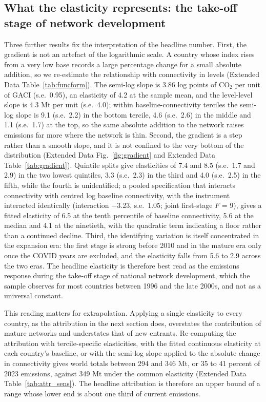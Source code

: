\documentclass[12pt]{article}
\begin{document}
\subsection*{What the elasticity represents: the take-off stage of network
development}
Three further results fix the interpretation of the headline number. First,
the gradient is not an artefact of the logarithmic scale. A country whose
index rises from a very low base records a large percentage change for a
small absolute addition, so we re-estimate the relationship with
connectivity in levels (Extended Data Table~\ref{tab:funcform}). The
semi-log slope is 3.86 log points of CO$_2$ per unit of GACI (s.e.\ 0.95),
an elasticity of 4.2 at the sample mean, and the level-level slope is 4.3
Mt per unit (s.e.\ 4.0); within baseline-connectivity terciles the
semi-log slope is 9.1 (s.e.\ 2.2) in the bottom tercile, 4.6 (s.e.\ 2.6)
in the middle and 1.1 (s.e.\ 1.7) at the top, so the same absolute addition to the network raises emissions far
more where the network is thin. Second, the gradient is a step rather than
a smooth slope, and it is not confined to the very bottom of the
distribution (Extended Data Fig.~\ref{fig:gradient} and Extended Data
Table~\ref{tab:gradient}). Quintile splits give elasticities of 7.4 and 8.5 (s.e.\ 1.7 and 2.9) in
the two lowest quintiles, 3.3 (s.e.\ 2.3) in the third and 4.0
(s.e.\ 2.5) in the fifth, while the fourth is unidentified; a pooled
specification that interacts connectivity with centred log baseline
connectivity, with the instrument interacted identically (interaction
$-$3.23, s.e.\ 1.05; joint first-stage $F$ = 9), gives a fitted elasticity
of 6.5 at the tenth percentile of baseline connectivity, 5.6 at the median
and 4.1 at the ninetieth, with the quadratic term indicating a floor
rather than a continued decline. Third, the identifying variation is itself
concentrated in the expansion era: the first stage is strong before 2010
and in the mature era only once the COVID years are excluded, and the
elasticity falls from 5.6 to 2.9 across the two eras. The headline
elasticity is therefore best read as the emissions response during the
take-off stage of national network development, which the sample
observes for most countries between 1996 and the late 2000s, and not as a
universal constant.


This reading matters for extrapolation. Applying a single elasticity to
every country, as the attribution in the next section does, overstates the
contribution of mature networks and understates that of new entrants.
Re-computing the attribution with tercile-specific elasticities, with the
fitted continuous elasticity at each country's baseline, or with the
semi-log slope applied to the absolute change in connectivity gives world
totals between 294 and 346 Mt, or 35 to 41 percent of 2023 emissions,
against 349 Mt under the common elasticity (Extended Data
Table~\ref{tab:attr_sens}). The headline attribution is therefore an upper
bound of a range whose lower end is about one third of current emissions.
\end{document}
